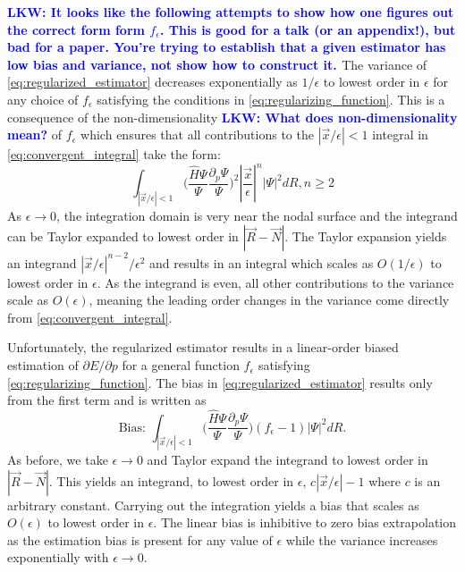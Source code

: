 \documentclass[twocolumn]{revtex4-1}
\newcommand{\lucas}[1]{\textbf{\textcolor{blue}{LKW: #1}}}
\begin{document}
\lucas{It looks like the following attempts to show how one figures out the correct form form $f_\epsilon$. This is good for a talk (or an appendix!), but bad for a paper. You're trying to establish that a given estimator has low bias and variance, not show how to construct it. }
The variance of \eqref{eq:regularized_estimator} decreases exponentially as $1/\epsilon$ to lowest order in $\epsilon$ for any choice of $f_\epsilon$ satisfying the conditions in \eqref{eq:regularizing_function}.
This is a consequence of the non-dimensionality \lucas{What does non-dimensionality mean?} of $f_\epsilon$ which ensures that all contributions to the $|\vec{x}/\epsilon|< 1$ integral in \eqref{eq:convergent_integral} take the form:
\begin{equation}
\int_{|\vec{x}/\epsilon|< 1} \Big(\frac{\hat{H}\Psi}{\Psi}\frac{\partial_p\Psi}{\Psi}\Big)^2 |\frac{\vec{x}}{\epsilon}|^n |\Psi|^2 dR, n\geq 2
\end{equation}
As $\epsilon \rightarrow 0$, the integration domain is very near the nodal surface and the integrand can be Taylor expanded to lowest order in $|\vec{R}-\vec{N}|$. 
The Taylor expansion yields an integrand $|\vec{x}/\epsilon|^{n-2}/\epsilon^2$ and results in an integral which scales as $O(1/\epsilon)$ to lowest order in $\epsilon$.
As the integrand is even, all other contributions to the variance scale as $O(\epsilon)$, meaning the leading order changes in the variance come directly from \eqref{eq:convergent_integral}.

Unfortunately, the regularized estimator results in a linear-order biased estimation of $\partial E/\partial p$ for a general function $f_\epsilon$ satisfying \eqref{eq:regularizing_function}.
The bias in \eqref{eq:regularized_estimator} results only from the first term and is written as 
\begin{equation}
\text{Bias: } \int_{|\vec{x}/\epsilon|< 1} \Big(\frac{\hat{H}\Psi}{\Psi}\frac{\partial_p\Psi}{\Psi}\Big) (f_\epsilon - 1)|\Psi|^2 dR.
\label{eq:estimator_bias}
\end{equation}
As before, we take $\epsilon \rightarrow 0$ and Taylor expand the integrand to lowest order in $|\vec{R}-\vec{N}|$.
This yields an integrand, to lowest order in $\epsilon$, $c|\vec{x}/\epsilon| - 1$ where $c$ is an arbitrary constant.
Carrying out the integration yields a bias that scales as $O(\epsilon)$ to lowest order in $\epsilon$.
The linear bias is inhibitive to zero bias extrapolation as the estimation bias is present for any value of $\epsilon$ while the variance increases exponentially with $\epsilon \rightarrow 0$.
\end{document}
